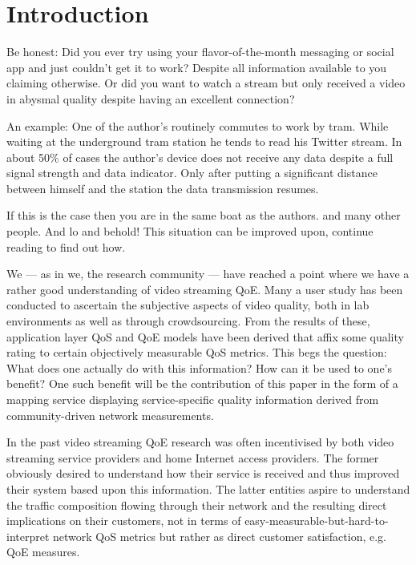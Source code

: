\section{Introduction}
\label{sec:introduction}


Be honest: Did you ever try using your flavor-of-the-month messaging or
social app and just couldn't get it to work? Despite all information
available to you claiming otherwise. Or did you want to watch a stream
but only received a video in abysmal quality despite having an excellent
connection?

An example: One of the author's routinely commutes to work by tram.
While waiting at the underground tram station he tends to read his
Twitter stream. In about 50\% of cases the author's device does not
receive any data despite a full signal strength and data indicator. Only
after putting a significant distance between himself and the station the
data transmission resumes.

If this is the case then you are in the same boat as the authors. and
many other people. And lo and behold! This situation can be improved
upon, continue reading to find out how.

We --- as in we, the research community --- have reached a point where we have a rather good understanding of video streaming \gls{QoE}. Many a user study has been conducted to ascertain the subjective aspects of video quality, both in lab environments as well as through crowdsourcing. From the results of these, application layer \gls{QoS} and \gls{QoE} models have been derived that affix some quality rating to certain objectively measurable \gls{QoS} metrics. This begs the question: What does one actually do with this information? How can it be used to one's benefit? One such benefit will be the contribution of this paper in the form of a mapping service displaying service-specific quality information derived from community-driven network measurements.

In the past video streaming \gls{QoE} research was often incentivised by both video streaming service providers and home Internet access providers. The former obviously desired to understand how their service is received and thus improved their system based upon this information. The latter entities aspire to understand the traffic composition flowing through their network and the resulting direct implications on their customers, not in terms of easy-measurable-but-hard-to-interpret network \gls{QoS} metrics but rather as direct customer satisfaction, e.g. \gls{QoE} measures.

